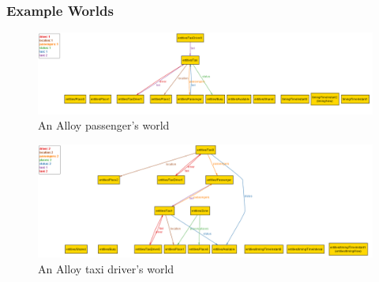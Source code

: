 \documentclass{article}
\begin{document}
\begin{landscape}

\subsubsection{Example Worlds}


\begin{figure}[h!]
        \centering
        \includegraphics[width=1\columnwidth]{alloy/passenger-world}
        \caption{An Alloy passenger's world}
        \label{fig:alloy-passenger-world}
    \end{figure}
    
\begin{figure}[h!]
        \centering
        \includegraphics[width=1\columnwidth]{alloy/taxi-driver-world}
        \caption{An Alloy taxi driver's world}
        \label{fig:alloy-taxi-driver-world}
    \end{figure}

\end{landscape}
\end{document}
